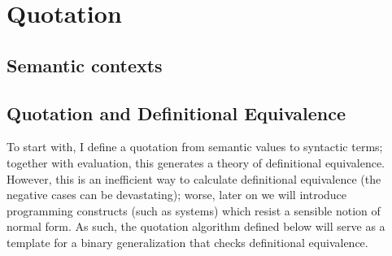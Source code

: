 \documentclass{article}
\DeclarePairedDelimiter\Squares{[}{]}
\newcommand\FmtKwd[1]{\mathsf{#1}}
\newcommand\DeclBox[1]{\framebox{$\displaystyle{}#1$}}
\newcommand\FmtThin[1]{{\color{ProcessBlue}#1}}
\newcommand\Atom[1]{{\boldsymbol\alpha}_{#1}}
\newcommand\Var[1]{\mathsf{v}_{#1}}
\newcommand\FmtTm[1]{{\color{Violet}#1}}
\newcommand\FmtVal[1]{{\color{Red}{#1}}}
\begin{document}
\section{Quotation}

\newcommand\QuoteCan[4]{
  \FmtVal{#1}\vDash\FmtVal{#2}\ni\FmtVal{#3}\Uparrow\FmtTm{#4}
}

\newcommand\QuoteNeu[4]{
  \FmtVal{#1}\vDash\FmtVal{#2}\Uparrow\FmtTm{#3}\in\FmtVal{#4}
}

\newcommand\SortCtx[1]{\FmtKwd{ctx}_{#1}}

\subsection{Semantic contexts}


\subsection{Quotation and Definitional Equivalence}

To start with, I define a quotation from semantic values to syntactic
terms; together with evaluation, this generates a theory of
definitional equivalence. However, this is an inefficient way to
calculate definitional equivalence (the negative cases can be
devastating); worse, later on we will introduce programming constructs
(such as systems) which resist a sensible notion of normal form. As
such, the quotation algorithm defined below will serve as a template
for a binary generalization that checks definitional equivalence.

\newcommand\LookupAtom[4]{\FmtVal{#1}\ni\Atom{#2}:\Squares*{\FmtThin{#4}*\FmtVal{#3}}}
\newcommand\LookupVar[4]{\FmtVal{#1}\ni\Var{#2}:\Squares*{\FmtThin{#4}*\FmtVal{#3}}}
\end{document}
